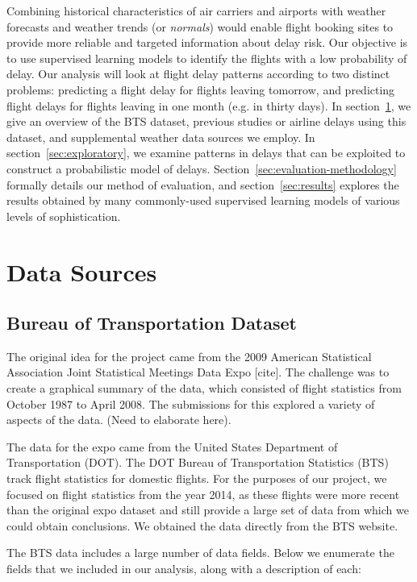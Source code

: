 \documentclass{article}
\begin{document}
Combining historical characteristics of air carriers and airports with weather forecasts and weather trends (or \emph{normals}) would enable flight booking sites to provide more reliable and targeted information about delay risk.
Our objective is to use supervised learning models to identify the flights with a low probability of delay. Our analysis will look at flight delay patterns according to two distinct problems: predicting a flight delay for flights leaving tomorrow, and predicting flight delays for flights leaving in one month (e.g. in thirty days).
In section~\ref{sec:data-sources}, we give an overview of the BTS dataset, previous studies or airline delays using this dataset, and supplemental weather data sources we employ.
In section~\ref{sec:exploratory}, we examine patterns in delays that can be exploited to construct a probabilistic model of delays.
Section~\ref{sec:evaluation-methodology} formally details our method of evaluation, and section~\ref{sec:results} explores the results obtained by many commonly-used supervised learning models of various levels of sophistication. \section{Data Sources}

\label{sec:data-sources}
\subsection{Bureau of Transportation Dataset}

The original idea for the project came from the 2009 American Statistical Association Joint Statistical Meetings Data Expo [cite]. The challenge was to create a graphical summary of the data, which consisted of flight statistics from October 1987 to April 2008. The submissions for this explored a variety of aspects of the data. (Need to elaborate here).

The data for the expo came from the United States Department of Transportation (DOT). The DOT Bureau of Transportation Statistics (BTS) track flight statistics for domestic flights. For the purposes of our project, we focused on flight statistics from the year 2014, as these flights were more recent than the original expo dataset and still provide a large set of data from which we could obtain conclusions. We obtained the data directly from the BTS website.  

The BTS data includes a large number of data fields. Below we enumerate the fields that we included in our analysis, along with a description of each:
\end{document}
